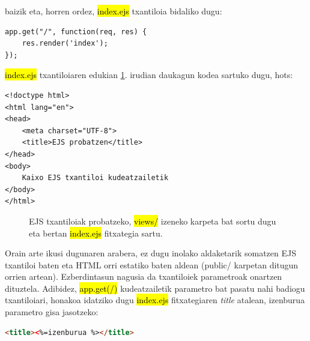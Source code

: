baizik eta, horren ordez, \hl{index.ejs} txantiloia bidaliko dugu:

\begin{lstlisting}
app.get("/", function(req, res) {
    res.render('index');
});
\end{lstlisting}

\hl{index.ejs} txantiloiaren edukian \ref{fig:ejs}. irudian daukagun kodea sartuko dugu, hots:

\begin{lstlisting}
<!doctype html>
<html lang="en">
<head>
    <meta charset="UTF-8">
    <title>EJS probatzen</title>
</head>
<body>
    Kaixo EJS txantiloi kudeatzailetik
</body>
</html>
\end{lstlisting}

\begin{figure}[ht]
	\centering
{}
\caption{EJS txantiloiak probatzeko, \hl{views/} izeneko karpeta bat sortu dugu eta bertan \hl{index.ejs} fitxategia sartu.}
\label{fig:ejs}
\end{figure}

Orain arte ikusi dugunaren arabera, ez dugu inolako aldaketarik somatzen EJS txantiloi baten eta HTML orri estatiko baten aldean (public/ karpetan ditugun orrien artean). Ezberdintasun nagusia da txantiloiek parametroak onartzen dituztela. Adibidez, \hl{app.get(\textquotesingle{}/\textquotesingle{})} kudeatzailetik parametro bat pasatu nahi badiogu txantiloiari, honakoa idatziko dugu \hl{index.ejs} fitxategiaren \textit{title} atalean, izenburua parametro gisa jasotzeko:

\begin{lstlisting}[language=HTML]
<title><%=izenburua %></title>    
\end{lstlisting}

